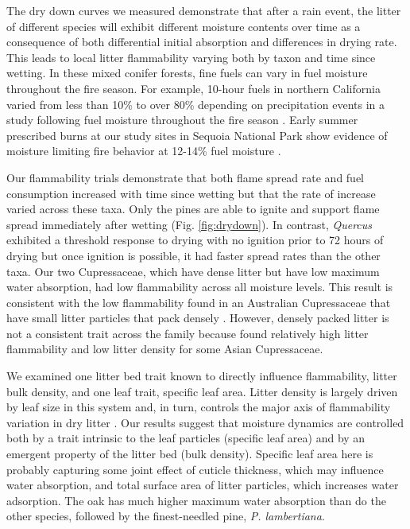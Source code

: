 \documentclass[letterpaper,12pt]{article}
\begin{document}
The dry down curves we measured demonstrate that after a rain event, the litter
of different species will exhibit different moisture contents over time as a
consequence of both differential initial absorption and differences in drying
rate. This leads to local litter flammability varying both by taxon and time
since wetting. In these mixed conifer forests, fine fuels can vary in fuel
moisture throughout the fire season. For example, 10-hour fuels in northern
California varied from less than 10\% to over 80\% depending on precipitation
events in a study following fuel moisture throughout the fire season
\citep{Estes+Knapp+etal-2012}. Early summer prescribed burns at our study sites
in Sequoia National Park show evidence of moisture limiting fire behavior at
12-14\% fuel moisture \citep{Knapp+Keeley+etal-2005}.

Our flammability trials demonstrate that both flame spread rate and fuel
consumption increased with time since wetting but that the rate of increase
varied across these taxa. Only the pines are able to ignite and support flame
spread immediately after wetting (Fig. \ref{fig:drydown}). In contrast,
\emph{Quercus} exhibited a threshold response to drying with no ignition prior
to 72 hours of drying but once ignition is possible, it had faster spread rates
than the other taxa. Our two Cupressaceae, which have dense litter but have low
maximum water absorption, had low flammability across all moisture levels. This
result is consistent with the low flammability found in an Australian
Cupressaceae that have small litter particles that pack densely
\citep{Scarff+Westoby-2006, Bowman+Haverkamp+etal-2018}. However, densely
packed litter is not a consistent trait across the family because
\citet{Cornwell+Elvira+etal-2015} found relatively high litter flammability and
low litter density for some Asian Cupressaceae.

We examined one litter bed trait known to directly influence flammability,
litter bulk density, and one leaf trait, specific leaf area. Litter density is
largely driven by leaf size in this system and, in turn, controls the major
axis of flammability variation in dry litter \citep{Magalhaes+Schwilk-2012}.
Our results suggest that moisture dynamics are controlled both by a trait
intrinsic to the leaf particles (specific leaf area) and by an emergent
property of the litter bed (bulk density). Specific leaf area here is probably
capturing some joint effect of cuticle thickness, which may influence water
absorption, and total surface area of litter particles, which increases water
adsorption. The oak has much higher maximum water absorption than do the other
species, followed by the finest-needled pine, \emph{P. lambertiana}.
\end{document}
